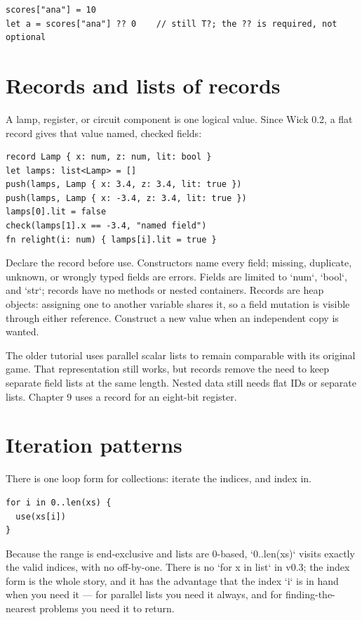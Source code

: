 \begin{lstlisting}[language=wick]
scores["ana"] = 10
let a = scores["ana"] ?? 0    // still T?; the ?? is required, not optional
\end{lstlisting}

\section{Records and lists of records}

A lamp, register, or circuit component is one logical value. Since Wick 0.2,
a flat record gives that value named, checked fields:

\begin{lstlisting}[language=wick]
record Lamp { x: num, z: num, lit: bool }
let lamps: list<Lamp> = []
push(lamps, Lamp { x: 3.4, z: 3.4, lit: true })
push(lamps, Lamp { x: -3.4, z: 3.4, lit: true })
lamps[0].lit = false
check(lamps[1].x == -3.4, "named field")
fn relight(i: num) { lamps[i].lit = true }
\end{lstlisting}

Declare the record before use. Constructors name every field; missing,
duplicate, unknown, or wrongly typed fields are errors. Fields are limited
to `num`, `bool`, and `str`; records have no methods or nested containers.
Records are heap objects: assigning one to another variable shares it, so a
field mutation is visible through either reference. Construct a new value
when an independent copy is wanted.

The older tutorial uses parallel scalar lists to remain comparable with its
original game. That representation still works, but records remove the need
to keep separate field lists at the same length. Nested data still needs flat
IDs or separate lists. Chapter 9 uses a record for an eight-bit register.

\section{Iteration patterns}

There is one loop form for collections: iterate the indices, and index in.

\begin{lstlisting}[language=wick]
for i in 0..len(xs) {
  use(xs[i])
}
\end{lstlisting}

\noindent
Because the range is end-exclusive and lists are 0-based, `0..len(xs)` visits
exactly the valid indices, with no off-by-one. There is no `for x in list` in
v0.3; the index form is the whole story, and it has the advantage that the
index `i` is in hand when you need it --- for parallel lists you need it always,
and for finding-the-nearest problems you need it to return.

